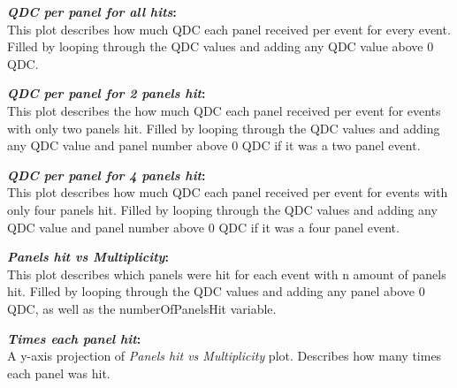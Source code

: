 \documentclass[a4paper,12pt]{article}
\begin{document}
\textbf{\emph{QDC per panel for all hits}:} \\
This plot describes how much QDC each panel received per event for every event. Filled by looping through the QDC values and adding any QDC value above 0 QDC.

\textbf{\emph{QDC per panel for 2 panels hit}:} \\
This plot describes the how much QDC each panel received per event for events with only two panels hit. Filled by looping through the QDC values and adding any QDC value and panel number above 0 QDC if it was a two panel event.

\textbf{\emph{QDC per panel for 4 panels hit}:} \\
This plot describes how much QDC each panel received per event for events with only four panels hit. Filled by looping through the QDC values and adding any QDC value and panel number above 0 QDC if it was a four panel event.

\pagebreak
\begin{figure}[h]
\centering
{}%
\end{figure}

\textbf{\emph{Panels hit vs Multiplicity}:} \\
This plot describes which panels were hit for each event with n amount of panels hit. Filled by looping through the QDC values and adding any panel above 0 QDC, as well as the numberOfPanelsHit variable.

\textbf{\emph{Times each panel hit}:} \\
A y-axis projection of \emph{Panels hit vs Multiplicity} plot. Describes how many times each panel was hit.
\end{document}
